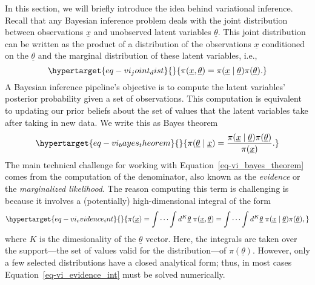 \documentclass[
  letterpaper,
  DIV=11,
  numbers=noendperiod]{scrartcl}
\begin{document}
\begin{refsegment}
In this section, we will briefly introduce the idea behind variational
inference. Recall that any Bayesian inference problem deals with the
joint distribution between observations \(\underline{x}\) and unobserved
latent variables \(\underline{\theta}\). This joint distribution can be
written as the product of a distribution of the observations
\(\underline{x}\) conditioned on the \(\underline{\theta}\) and the
marginal distribution of these latent variables, i.e.,
\begin{equation}\protect\hypertarget{eq-vi_joint_dist}{}{
\pi(\underline{x}, \underline{\theta}) =
\pi(\underline{x} \mid \underline{\theta}) \pi(\underline{\theta}).
}\label{eq-vi_joint_dist}\end{equation} A Bayesian inference pipeline's
objective is to compute the latent variables' posterior probability
given a set of observations. This computation is equivalent to updating
our prior beliefs about the set of values that the latent variables take
after taking in new data. We write this as Bayes theorem
\begin{equation}\protect\hypertarget{eq-vi_bayes_theorem}{}{
\pi(\underline{\theta} \mid \underline{x}) = 
\frac{
        \pi(\underline{x} \mid \underline{\theta})\pi(\underline{\theta})
    }{
        \pi(\underline{x})
    }.
}\label{eq-vi_bayes_theorem}\end{equation} The main technical challenge
for working with Equation~\ref{eq-vi_bayes_theorem} comes from the
computation of the denominator, also known as the \emph{evidence} or the
\emph{marginalized likelihood}. The reason computing this term is
challenging is because it involves a (potentially) high-dimensional
integral of the form
\begin{equation}\protect\hypertarget{eq-vi_evidence_int}{}{
\pi(\underline{x}) = 
\int\cdots\int d^K\underline{\theta}\; \pi(\underline{x}, \underline{\theta}) = 
\int\cdots\int d^K\underline{\theta}\; 
\pi(\underline{x} \mid \underline{\theta})
\pi(\underline{\theta}),
}\label{eq-vi_evidence_int}\end{equation} where \(K\) is the
dimesionality of the \(\underline{\theta}\) vector. Here, the integrals
are taken over the support---the set of values valid for the
distribution---of \(\pi(\underline{\theta})\). However, only a few
selected distributions have a closed analytical form; thus, in most
cases Equation~\ref{eq-vi_evidence_int} must be solved numerically.


\end{refsegment}
\end{document}
